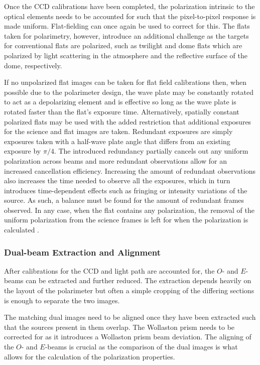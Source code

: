 Once the \gls{CCD} calibrations have been completed, the polarization intrinsic to the optical elements needs to be accounted for such that the pixel-to-pixel response is made uniform. Flat-fielding can once again be used to correct for this. The flats taken for polarimetry, however, introduce an additional challenge as the targets for conventional flats are polarized, such as twilight and dome flats which are polarized by light scattering in the atmosphere and the reflective surface of the dome, respectively.
\prgph

If no unpolarized flat images can be taken for flat field calibrations then, when possible due to the polarimeter design, the wave plate may be constantly rotated to act as a depolarizing element and is effective so long as the wave plate is rotated faster than the flat's exposure time. Alternatively, spatially constant polarized flats may be used with the added restriction that additional exposures for the science and flat images are taken. Redundant exposures are simply exposures taken with a half-wave plate angle that differs from an existing exposure by $\pi / 4$. The introduced redundancy partially cancels out any uniform polarization across beams and more redundant observations allow for an increased cancellation efficiency. Increasing the amount of  redundant observations also increases the time needed to observe all the exposures, which in turn introduces time-dependent effects such as fringing or intensity variations of the source. As such, a balance must be found for the amount of redundant frames observed. In any case, when the flat contains any polarization, the removal of the uniform polarization  from the science frames is left for when the polarization is calculated \citep{polarimetry_error, pol_optimize}.
\prgph

\subsubsection{Dual-beam Extraction and Alignment}\label{subsubsec:pol_oe_extract}

After calibrations for the \gls{CCD} and light path are accounted for, the $O$- and $E$-beams can be extracted and further reduced. The extraction depends heavily on the layout of the polarimeter but often a simple cropping of the differing sections is enough to separate the two images.
\prgph

The matching dual images need to be aligned once they have been extracted such that the sources present in them overlap. The Wollaston prism needs to be corrected for as it introduces a Wollaston prism beam deviation. The aligning of the $O$- and $E$-beams is crucial as the comparison of the dual images is what allows for the calculation of the polarization properties.
\prgph

